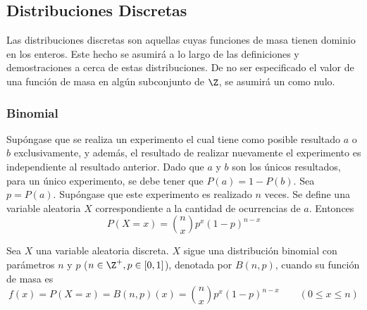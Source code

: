 \subsection{Distribuciones Discretas}
Las distribuciones discretas son aquellas cuyas funciones de masa tienen
dominio en los enteros. Este hecho se asumirá a lo largo de
las definiciones y demostraciones a cerca de estas distribuciones.
De no ser especificado el valor de una función de masa en algún
subconjunto de $\Z$, se asumirá un como nulo.

\subsubsection{Binomial}
\label{dist:binom}
Supóngase que se realiza un experimento el cual tiene como posible
resultado $a$ o $b$ exclusivamente, y además, el resultado
de realizar nuevamente el experimento es independiente al
resultado anterior. Dado que $a$ y $b$ son los únicos resultados,
para un único experimento, se debe tener que
$P(a) = 1 - P(b)$. Sea $p=P(a)$. Supóngase que
este experimento es realizado $n$ veces. Se define una variable
aleatoria $X$ correspondiente a la cantidad de ocurrencias de $a$.
Entonces
\[P(X=x) = \binom{n}{x}p^x(1-p)^{n-x}\]
\begin{Def}
  Sea $X$ una variable aleatoria discreta. $X$ sigue una distribución
  binomial con parámetros $n$ y $p$ ($n\in\Z^+, p\in[0,1]$), denotada por $B(n,p)$,
  cuando su función de masa es
  \[f(x) = P(X=x) = B(n,p)(x) = \binom{n}{x}p^x(1-p)^{n-x}
  \qquad(0\leq x \leq n)\]
\end{Def}

